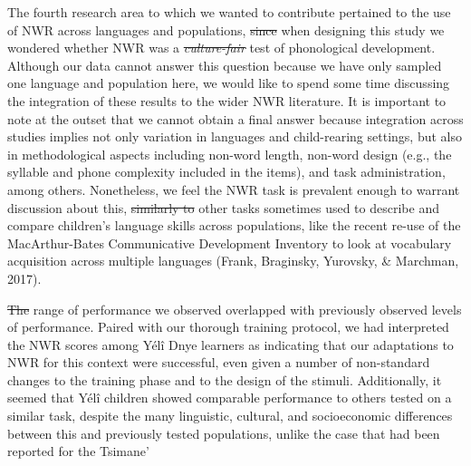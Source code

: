 \documentclass[english,,man,floatsintext]{apa6} %
\providecommand{\DIFaddtex}[1]{{\protect\color{blue}\uwave{#1}}} %
\providecommand{\DIFdeltex}[1]{{\protect\color{red}\sout{#1}}}                      %
\providecommand{\DIFaddbegin}{} %
\providecommand{\DIFaddend}{} %
\providecommand{\DIFdelbegin}{} %
\providecommand{\DIFdelend}{} %
\providecommand{\DIFadd}[1]{\texorpdfstring{\DIFaddtex{#1}}{#1}} %
\providecommand{\DIFdel}[1]{\texorpdfstring{\DIFdeltex{#1}}{}} %
\newcommand{\DIFscaledelfig}{0.5}
\newlength{\DIFdelgraphicswidth} %
\newlength{\DIFdelgraphicsheight} %
\newcommand{\DIFaddincludegraphics}[2][]{{\color{blue}\fbox{\DIFOincludegraphics[#1]{#2}}}} %
\newcommand{\DIFdelincludegraphics}[2][]{%
	\sbox{\DIFdelgraphicsbox}{\DIFOincludegraphics[#1]{#2}}%
	\settoboxwidth{\DIFdelgraphicswidth}{\DIFdelgraphicsbox} %
	\settoboxtotalheight{\DIFdelgraphicsheight}{\DIFdelgraphicsbox} %
	\scalebox{\DIFscaledelfig}{%
		\parbox[b]{\DIFdelgraphicswidth}{\usebox{\DIFdelgraphicsbox}\\[-\baselineskip] \rule{\DIFdelgraphicswidth}{0em}}\llap{\resizebox{\DIFdelgraphicswidth}{\DIFdelgraphicsheight}{%
				\setlength{\unitlength}{\DIFdelgraphicswidth}%
				\begin{picture}(1,1)%
				\thicklines\linethickness{2pt} %
				{\color[rgb]{1,0,0}\put(0,0){\framebox(1,1){}}}%
				{\color[rgb]{1,0,0}\put(0,0){\line( 1,1){1}}}%
				{\color[rgb]{1,0,0}\put(0,1){\line(1,-1){1}}}%
				\end{picture}%
			}\hspace*{3pt}}} %
} %
\DeclareRobustCommand{\DIFaddbegin}{\DIFOaddbegin \let\includegraphics\DIFaddincludegraphics} %
\DeclareRobustCommand{\DIFaddend}{\DIFOaddend \let\includegraphics\DIFOincludegraphics} %
\DeclareRobustCommand{\DIFdelbegin}{\DIFOdelbegin \let\includegraphics\DIFdelincludegraphics} %
\DeclareRobustCommand{\DIFdelend}{\DIFOaddend \let\includegraphics\DIFOincludegraphics} %
\begin{document}
The fourth research area to which we wanted to contribute pertained to the use of NWR across languages and populations, \DIFdelbegin \DIFdel{since }\DIFdelend \DIFaddbegin \DIFadd{as }\DIFaddend when designing this study we wondered whether NWR was a \emph{\DIFdelbegin \DIFdel{culture-fair}\DIFdelend \DIFaddbegin \DIFadd{fair}\DIFaddend } test of phonological development. Although our data cannot answer this question because we have only sampled one language and population here, we would like to spend some time discussing the integration of these results to the wider NWR literature. It is important to note at the outset that we cannot obtain a final answer because integration across studies implies not only variation in languages and child-rearing settings, but also in methodological aspects including non-word length, non-word design (e.g., the syllable and phone complexity included in the items), and task administration, among others. Nonetheless, we feel the NWR task is prevalent enough to warrant discussion about this, \DIFdelbegin \DIFdel{similarly to }\DIFdelend \DIFaddbegin \DIFadd{as it is done for }\DIFaddend other tasks sometimes used to describe and compare children's language skills across populations, like the recent re-use of the MacArthur-Bates Communicative Development Inventory to look at vocabulary acquisition across multiple languages (Frank, Braginsky, Yurovsky, \& Marchman, 2017).

\DIFdelbegin \DIFdel{The }\DIFdelend \DIFaddbegin \DIFadd{At first sight, the }\DIFaddend range of performance we observed overlapped with previously observed levels of performance. Paired with our thorough training protocol, we had interpreted the NWR scores among Yélî Dnye learners as indicating that our adaptations to NWR for this context were successful, even given a number of non-standard changes to the training phase and to the design of the stimuli. Additionally, it seemed that Yélî children showed comparable performance to others tested on a similar task, despite the many linguistic, cultural, and socioeconomic differences between this and previously tested populations, unlike the case that had been reported for the Tsimane'\DIFaddbegin \DIFadd{.
}
\end{document}
